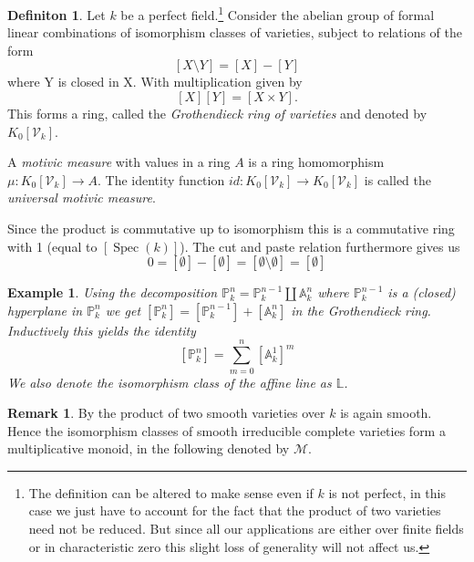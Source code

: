 \documentclass[11pt, a4paper, german]{article}
\theoremstyle{plain}
\newtheorem{example}[theorem]{Example}
\theoremstyle{definition}
\newtheorem{definition}[theorem]{Definiton}
\newtheorem{remark}[theorem]{Remark}
\newcommand{\gring}[1][k]{K_0[\mathcal{V}_#1]}
\DeclareMathOperator{\spec}{Spec}
\begin{document}
\begin{definition}
    Let $k$ be a perfect field.\footnote{The definition can be altered to make sense even if $k$ is not perfect, 
    in this case we just have to account for the fact that the product of two varieties need not be reduced. 
    But since all our applications are either over finite fields or in characteristic zero this slight loss of generality will not affect us.}
    Consider the abelian group of formal linear combinations of isomorphism classes of varieties, subject to relations of the form
    \[
        [X \setminus Y] = [X] - [Y]
    \] where Y is closed in X.
    With multiplication given by
    \[
        [X][Y] = [X \times Y].
    \]
    This forms a ring, called the \emph{Grothendieck ring of varieties} and denoted by $\gring$. 
    
    A \emph{motivic measure} with values in a ring $A$ is a ring homomorphism $\mu \colon \gring \to A$. The identity function
    $id \colon \gring \to \gring$ is called the \emph{universal motivic measure}.
\end{definition}

Since the product is commutative up to isomorphism this is a commutative ring with 1 (equal to $[\spec(k)]$). 
The cut and paste relation furthermore gives us
\[
    0 = [\emptyset] - [\emptyset] = [\emptyset \setminus \emptyset] = [\emptyset]
\]


\begin{example}
    \label{projSum}
    Using the decomposition $\mathbb{P}_k^n = \mathbb{P}_k^{n-1} \coprod \mathbb{A}_k^n$ where $\mathbb{P}_k^{n-1}$ is a (closed) hyperplane
    in $\mathbb{P}_k^n$  we get $[\mathbb{P}_k^n] = [\mathbb{P}_k^{n-1}] + [\mathbb{A}_k^n]$ in the Grothendieck ring.
    Inductively this yields the identity 
    \[
        [\mathbb{P}_k^n] = \sum_{m=0}^n [\mathbb{A}_k^1]^m
    \]
    We also denote the isomorphism class of the affine line as $\mathbb{L}$.
\end{example}

\begin{remark}
    By \cite[Prop. 10.1 (d)]{Ha} the product of two smooth varieties over $k$ is again smooth. Hence the isomorphism classes of smooth
    irreducible complete varieties form a multiplicative monoid, in the following denoted by $\mathcal{M}$.
\end{remark}
\end{document}
